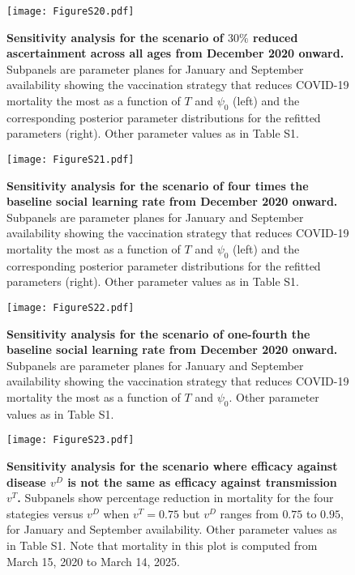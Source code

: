 \documentclass[10pt,onecolumn,twoside,lineno]{pnas-new}
\begin{document}
\clearpage 

\begin{figure}[H]
\centering
\texttt{[image: FigureS20.pdf]}
\caption{\textbf{Sensitivity analysis for the scenario of $30 \%$ reduced ascertainment across all ages from December 2020 onward.} Subpanels are parameter planes for January and September availability showing the vaccination strategy that reduces COVID-19 mortality the most as a function of $T$ and $\psi_0$ (left) and the corresponding posterior parameter distributions for the refitted parameters (right).  Other parameter values as in Table S1.}
\label{plot_model}
\end{figure}

\clearpage 


\begin{figure}[H]
\centering
\texttt{[image: FigureS21.pdf]}
\caption{\textbf{Sensitivity analysis for the scenario of four times the baseline social learning rate from December 2020 onward.} Subpanels are parameter planes for January and September availability showing the vaccination strategy that reduces COVID-19 mortality the most as a function of $T$ and $\psi_0$ (left) and the corresponding posterior parameter distributions for the refitted parameters (right).  Other parameter values as in Table S1.}
\label{plot_model}
\end{figure}

\clearpage 

\begin{figure}[H]
\centering
\texttt{[image: FigureS22.pdf]}
\caption{\textbf{Sensitivity analysis for the scenario of one-fourth the baseline social learning rate from December 2020 onward.} Subpanels are parameter planes for January and September availability showing the vaccination strategy that reduces COVID-19 mortality the most as a function of $T$ and $\psi_0$.  Other parameter values as in Table S1.}
\label{plot_model}
\end{figure}

\clearpage 

\begin{figure}[H]
\centering
\texttt{[image: FigureS23.pdf]}
\caption{\textbf{Sensitivity analysis for the scenario where efficacy against disease $v^D$ is not the same as efficacy against transmission $v^T$.} Subpanels show percentage reduction in mortality for the four stategies versus $v^D$ when $v^T=0.75$ but $v^D$ ranges from $0.75$ to $0.95$, for January and September availability.  Other parameter values as in Table S1.  Note that mortality in this plot is computed from March 15, 2020 to March 14, 2025.}
\label{plot_model}
\end{figure}
\end{document}
